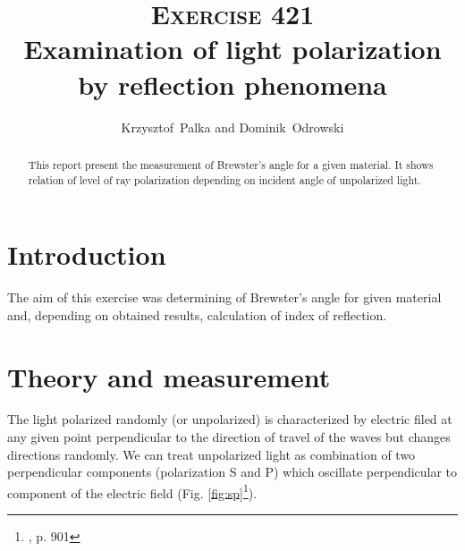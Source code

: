 \documentclass[a4paper,12pt]{article}
\author{Krzysztof~Palka and Dominik~Odrowski}
\title{\textsc{Exercise} 421 \\ Examination of light polarization by reflection phenomena}
\begin{document}
\maketitle

\begin{abstract}
    This report present the measurement of Brewster's angle for a given material. It shows relation of level of ray polarization depending on incident angle of unpolarized light.    
\end{abstract}

\section{Introduction}
    The aim of this exercise was determining of Brewster's angle for given material and, depending on obtained results, calculation of index of reflection. 


\section{Theory and measurement}
    The light polarized randomly (or unpolarized) is characterized by electric filed at any given point perpendicular to the direction of travel of the waves but changes directions randomly. We can treat unpolarized light as combination of two perpendicular components (polarization S and P) which oscillate perpendicular to component of the electric field (Fig. \ref{fig:sp}\footnote{\cite{HRW}, p. 901}).
\end{document}
